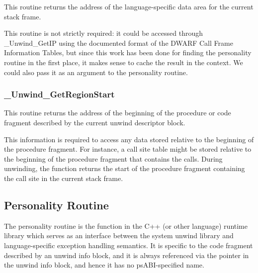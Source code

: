 This routine returns the address of the language-specific data area for 
the current stack frame. 

This routine is not strictly required: it could be accessed through 
\_Unwind\_GetIP using the documented format of the DWARF Call Frame 
Information Tables, but since this work has been done for finding the 
personality routine in the first place, it makes sense to cache the 
result in the context. 
We could also pass it as an argument to the personality routine. 

\subsubsection{\_Unwind\_GetRegionStart}


This routine returns the address of the beginning of the procedure or 
code fragment described by the current unwind descriptor block. 

This information is required to access any data stored relative to the
beginning of the procedure fragment. For instance, a call site table
might be stored relative to the beginning of the procedure fragment
that contains the calls. During unwinding, the function returns the
start of the procedure fragment containing the call site in the current
stack frame.

\subsection{Personality Routine}


The personality routine is the function in the C++ (or other language)
runtime library which serves as an interface between the system
unwind library and language-specific exception handling semantics.
It is specific to the code fragment described by an unwind info block,
and it is always referenced via the pointer in the unwind info block,
and hence it has no psABI-specified name.

